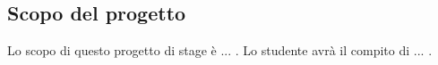 
\subsection{Scopo del progetto}
	Lo scopo di questo progetto di stage è ... .
	Lo studente avrà il compito di ... .
